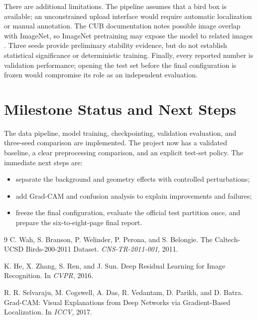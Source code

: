 \documentclass[10pt,twocolumn,letterpaper]{article}
\begin{document}
There are additional limitations. The pipeline assumes that a bird box is
available; an unconstrained upload interface would require automatic
localization or manual annotation. The CUB documentation notes possible image
overlap with ImageNet, so ImageNet pretraining may expose the model to related
images \cite{wah2011cub}. Three seeds provide preliminary stability evidence,
but do not establish statistical significance or deterministic training.
Finally, every reported number is validation performance; opening the test set
before the final configuration is frozen would compromise its role as an
independent evaluation.

\section{Milestone Status and Next Steps}

The data pipeline, model training, checkpointing, validation evaluation, and
three-seed comparison are implemented. The project now has a validated
baseline, a clear preprocessing comparison, and an explicit test-set policy.
The immediate next steps are:

\begin{itemize}
\item separate the background and geometry effects with controlled
perturbations;
\item add Grad-CAM and confusion analysis to explain improvements and failures;
\item freeze the final configuration, evaluate the official test partition
once, and prepare the six-to-eight-page final report.
\end{itemize}

\begin{thebibliography}{9}
\small
{}
C. Wah, S. Branson, P. Welinder, P. Perona, and S. Belongie.
\newblock The Caltech-UCSD Birds-200-2011 Dataset.
\newblock \emph{CNS-TR-2011-001}, 2011.

K. He, X. Zhang, S. Ren, and J. Sun.
\newblock Deep Residual Learning for Image Recognition.
\newblock In \emph{CVPR}, 2016.

R. R. Selvaraju, M. Cogswell, A. Das, R. Vedantam, D. Parikh, and D. Batra.
\newblock Grad-CAM: Visual Explanations from Deep Networks via
Gradient-Based Localization.
\newblock In \emph{ICCV}, 2017.

\end{thebibliography}
\end{document}
